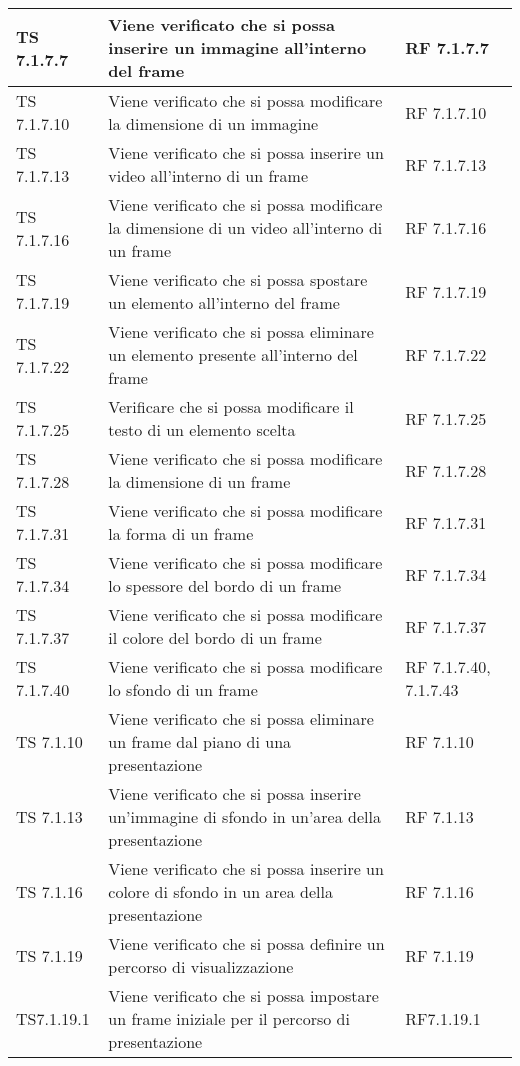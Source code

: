 {{\begin{longtable} [c]{| p{3cm} | p{6cm} |p{3cm}|}
			\hline
			TS 7.1.7.7 & Viene verificato che si possa inserire un immagine all'interno del frame & RF 7.1.7.7\\
			\hline
			TS 7.1.7.10 & Viene verificato che si possa modificare la dimensione di un immagine & RF 7.1.7.10\\
			\hline
			TS 7.1.7.13 & Viene verificato che si possa inserire un video all'interno di un frame & RF 7.1.7.13\\
			\hline
			TS 7.1.7.16 & Viene verificato che si possa modificare la dimensione di un video all'interno di un frame & RF 7.1.7.16\\
			\hline
			TS 7.1.7.19 & Viene verificato che si possa spostare un elemento all'interno del frame & RF 7.1.7.19\\
			\hline
			TS 7.1.7.22 & Viene verificato che si possa eliminare un elemento presente all'interno del frame & RF 7.1.7.22 \\
			\hline
			TS 7.1.7.25 & Verificare che si possa modificare il testo di un elemento scelta & RF 7.1.7.25\\
			\hline
			TS 7.1.7.28 & Viene verificato che si possa modificare la dimensione di un frame & RF 7.1.7.28\\
			\hline
			TS 7.1.7.31 & Viene verificato che si possa modificare la forma di un frame & RF 7.1.7.31\\
			\hline
			TS 7.1.7.34 & Viene verificato che si possa modificare lo spessore del bordo di un frame & RF 7.1.7.34\\
			\hline
			TS 7.1.7.37 & Viene verificato che si possa modificare il colore del bordo di un frame & RF 7.1.7.37\\
			\hline
			TS 7.1.7.40 & Viene verificato che si possa modificare lo sfondo di un frame & RF 7.1.7.40, 7.1.7.43\\
			\hline
			TS 7.1.10 & Viene verificato che si possa eliminare un frame dal piano di una presentazione & RF 7.1.10\\
			\hline
			TS 7.1.13 & Viene verificato che si possa inserire un'immagine di sfondo in un'area della presentazione & RF 7.1.13 \\
			\hline
			TS 7.1.16 & Viene verificato che si possa inserire un colore di sfondo in un area della presentazione & RF 7.1.16\\
			\hline
			TS 7.1.19 & Viene verificato che si possa definire un percorso di visualizzazione & RF 7.1.19\\
			\hline				
			TS7.1.19.1 & Viene verificato che si possa impostare un frame iniziale per il percorso di presentazione & RF7.1.19.1\\

\end{longtable}}}
